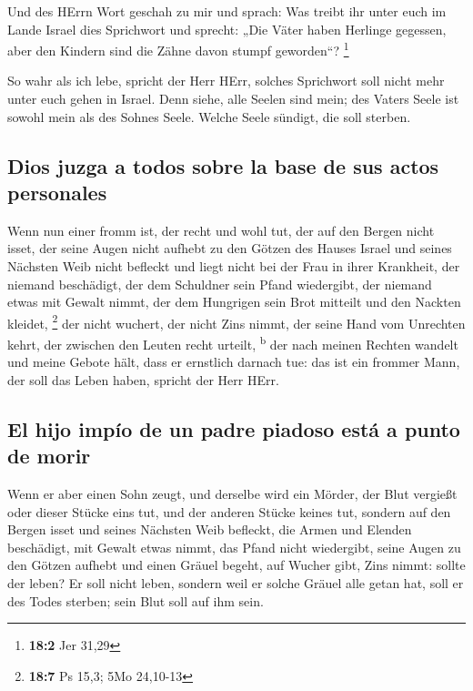  Und des HErrn Wort geschah zu mir und sprach:
 Was treibt ihr unter euch im Lande Israel dies Sprichwort
und sprecht: „Die Väter haben Herlinge gegessen, aber den Kindern sind
die Zähne davon stumpf geworden``? \footnote{\textbf{18:2} Jer 31,29}

 So wahr als ich lebe, spricht der Herr HErr, solches
Sprichwort soll nicht mehr unter euch gehen in Israel. 
Denn siehe, alle Seelen sind mein; des Vaters Seele ist sowohl mein als
des Sohnes Seele. Welche Seele sündigt, die soll sterben.

\hypertarget{dios-juzga-a-todos-sobre-la-base-de-sus-actos-personales}{%
\subsection{Dios juzga a todos sobre la base de sus actos
personales}\label{dios-juzga-a-todos-sobre-la-base-de-sus-actos-personales}}

 Wenn nun einer fromm ist, der recht und wohl tut,
 der auf den Bergen nicht isset, der seine Augen nicht
aufhebt zu den Götzen des Hauses Israel und seines Nächsten Weib nicht
befleckt und liegt nicht bei der Frau in ihrer Krankheit, 
der niemand beschädigt, der dem Schuldner sein Pfand wiedergibt, der
niemand etwas mit Gewalt nimmt, der dem Hungrigen sein Brot mitteilt und
den Nackten kleidet, \footnote{\textbf{18:7} Ps 15,3; 5Mo 24,10-13}
 der nicht wuchert, der nicht Zins nimmt, der seine Hand
vom Unrechten kehrt, der zwischen den Leuten recht urteilt,
\textsuperscript{b}  der nach meinen Rechten wandelt und
meine Gebote hält, dass er ernstlich darnach tue: das ist ein frommer
Mann, der soll das Leben haben, spricht der Herr HErr.

\hypertarget{el-hijo-impuxedo-de-un-padre-piadoso-estuxe1-a-punto-de-morir}{%
\subsection{El hijo impío de un padre piadoso está a punto de
morir}\label{el-hijo-impuxedo-de-un-padre-piadoso-estuxe1-a-punto-de-morir}}

 Wenn er aber einen Sohn zeugt, und derselbe wird ein
Mörder, der Blut vergießt oder dieser Stücke eins tut, 
und der anderen Stücke keines tut, sondern auf den Bergen isset und
seines Nächsten Weib befleckt,  die Armen und Elenden
beschädigt, mit Gewalt etwas nimmt, das Pfand nicht wiedergibt, seine
Augen zu den Götzen aufhebt und einen Gräuel begeht,  auf
Wucher gibt, Zins nimmt: sollte der leben? Er soll nicht leben, sondern
weil er solche Gräuel alle getan hat, soll er des Todes sterben; sein
Blut soll auf ihm sein.


